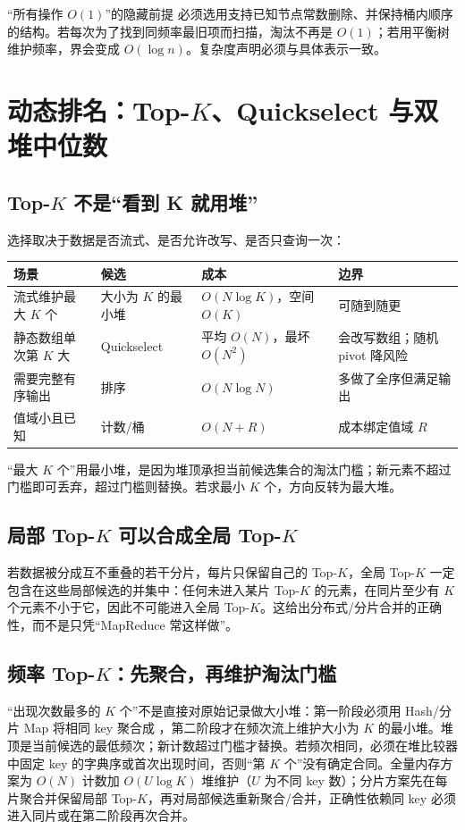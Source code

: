 \documentclass[UTF8,fontset=none,11pt,a4paper]{ctexart}
\begin{document}
\begin{warnbox}{“所有操作 $O(1)$”的隐藏前提}
必须选用支持已知节点常数删除、并保持桶内顺序的结构。若每次为了找到同频率最旧项而扫描，淘汰不再是 $O(1)$；若用平衡树维护频率，界会变成 $O(\log n)$。复杂度声明必须与具体表示一致。
\end{warnbox}

\section{动态排名：Top-$K$、Quickselect 与双堆中位数}

\subsection{Top-$K$ 不是“看到 K 就用堆”}
选择取决于数据是否流式、是否允许改写、是否只查询一次：
\begin{center}\small
\begin{tabularx}{\linewidth}{L{3.0cm}L{3.2cm}YY}
\toprule
场景 & 候选 & 成本 & 边界\\
\midrule
流式维护最大 $K$ 个 & 大小为 $K$ 的最小堆 & $O(N\log K)$，空间 $O(K)$ & 可随到随更\\
静态数组单次第 $K$ 大 & Quickselect & 平均 $O(N)$，最坏 $O(N^2)$ & 会改写数组；随机 pivot 降风险\\
需要完整有序输出 & 排序 & $O(N\log N)$ & 多做了全序但满足输出\\
值域小且已知 & 计数/桶 & $O(N+R)$ & 成本绑定值域 $R$\\
\bottomrule
\end{tabularx}
\end{center}
“最大 $K$ 个”用最小堆，是因为堆顶承担当前候选集合的淘汰门槛；新元素不超过门槛即可丢弃，超过门槛则替换。若求最小 $K$ 个，方向反转为最大堆。

\subsection{局部 Top-$K$ 可以合成全局 Top-$K$}
若数据被分成互不重叠的若干分片，每片只保留自己的 Top-$K$，全局 Top-$K$ 一定包含在这些局部候选的并集中：任何未进入某片 Top-$K$ 的元素，在同片至少有 $K$ 个元素不小于它，因此不可能进入全局 Top-$K$。这给出分布式/分片合并的正确性，而不是只凭“MapReduce 常这样做”。

\subsection{频率 Top-$K$：先聚合，再维护淘汰门槛}
“出现次数最多的 $K$ 个”不是直接对原始记录做大小堆：第一阶段必须用 Hash/分片 Map 将相同 key 聚合成 ，第二阶段才在频次流上维护大小为 $K$ 的最小堆。堆顶是当前候选的最低频次；新计数超过门槛才替换。若频次相同，必须在堆比较器中固定 key 的字典序或首次出现时间，否则“第 $K$ 个”没有确定合同。全量内存方案为 $O(N)$ 计数加 $O(U\log K)$ 堆维护（$U$ 为不同 key 数）；分片方案先在每片聚合并保留局部 Top-$K$，再对局部候选重新聚合/合并，正确性依赖同 key 必须进入同片或在第二阶段再次合并。
\end{document}
